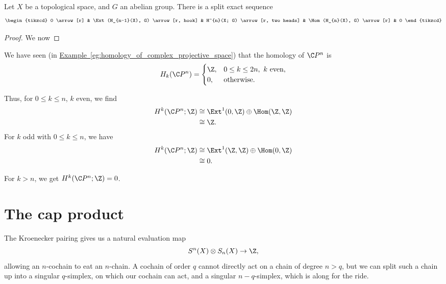 \documentclass[main.tex]{subfiles}
\begin{document}
\begin{theorem}
  Let $X$ be a topological space, and $G$ an abelian group. There is a split exact sequence
  \begin{equation*}
    \begin{tikzcd}
      0
      \arrow[r]
      & \Ext(H_{n-1}(X), G)
      \arrow[r, hook]
      & H^{n}(X; G)
      \arrow[r, two heads]
      & \Hom(H_{n}(X), G)
      \arrow[r]
      & 0
    \end{tikzcd}
  \end{equation*}
\end{theorem}
\begin{proof}
  We now
\end{proof}

\begin{example}
  We have seen (in \hyperref[eg:homology_of_complex_projective_space]{Example~\ref*{eg:homology_of_complex_projective_space}}) that the homology of $\C P^{n}$ is
  \begin{equation*}
    H_{k}(\C P^{n}) =
    \begin{cases}
      \Z, &0 \leq k \leq 2n,\ k \text{ even},\\
      0, &\text{otherwise}.
    \end{cases}
  \end{equation*}

  Thus, for $0 \leq k \leq n$, $k$ even, we find
  \begin{align*}
    H^{k}(\C P^{n}; \Z) &\cong \Ext^{1}(0, \Z) \oplus \Hom(\Z,\Z) \\
    &\cong \Z.
  \end{align*}
  For $k$ odd with $0 \leq k \leq n$, we have
  \begin{align*}
    H^{k}(\C P^{n}; \Z) &\cong \Ext^{1}(\Z, \Z) \oplus \Hom(0,\Z) \\
    &\cong 0.
  \end{align*}

  For $k > n$, we get $H^{k}(\C P^{n}; \Z) = 0$.
\end{example}

\section{The cap product}
\label{sec:the_cap_product}

The Kroenecker pairing gives us a natural evaluation map
\begin{equation*}
  S^{n}(X) \otimes S_{n}(X) \to \Z,
\end{equation*}
allowing an $n$-cochain to eat an $n$-chain. A cochain of order $q$ cannot directly act on a chain of degree $n > q$, but we can split such a chain up into a singular $q$-simplex, on which our cochain can act, and a singular $n-q$-simplex, which is along for the ride.
\end{document}
